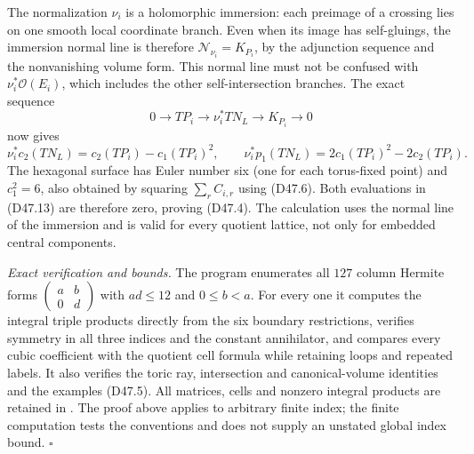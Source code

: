 The normalization $\nu_i$ is a holomorphic immersion:
each preimage of a crossing lies on one smooth local
coordinate branch. Even when its image has self-gluings,
the immersion normal line is therefore
$\mathcal N_{\nu_i}=K_{P_i}$, by the adjunction sequence
and the nonvanishing volume form. This normal line
must not be confused with $\nu_i^*\mathcal O(E_i)$,
which includes the other self-intersection branches.
The exact sequence
\[
       0\longrightarrow TP_i\longrightarrow\nu_i^*TN_L
                        \longrightarrow K_{P_i}\longrightarrow0
                                                               \tag{D47.12}
\]
now gives
\[
 \nu_i^*c_2(TN_L)=c_2(TP_i)-c_1(TP_i)^2,\qquad
 \nu_i^*p_1(TN_L)=2c_1(TP_i)^2-2c_2(TP_i).                 \tag{D47.13}
\]
The hexagonal surface has Euler number six (one for
each torus-fixed point) and $c_1^2=6$, also obtained
by squaring $\sum_rC_{i,r}$ using (D47.6).
Both evaluations in (D47.13) are therefore zero,
proving (D47.4). The calculation uses the normal line
of the immersion and is valid for every quotient
lattice, not only for embedded central components.

\emph{Exact verification and bounds.}
The program
enumerates all $127$ column Hermite forms
$\left(\begin{smallmatrix}a&b\\0&d\end{smallmatrix}\right)$
with $ad\le12$ and $0\le b<a$. For every one it
computes the integral triple products directly from
the six boundary restrictions, verifies symmetry
in all three indices and the constant annihilator,
and compares every cubic coefficient with the
quotient cell formula while retaining loops and
repeated labels. It also verifies the toric ray,
intersection and canonical-volume identities and
the examples (D47.5). All matrices, cells and
nonzero integral products are retained in
.
The proof above applies to arbitrary finite index;
the finite computation tests the conventions and
does not supply an unstated global index bound.
\hfill$\square$
